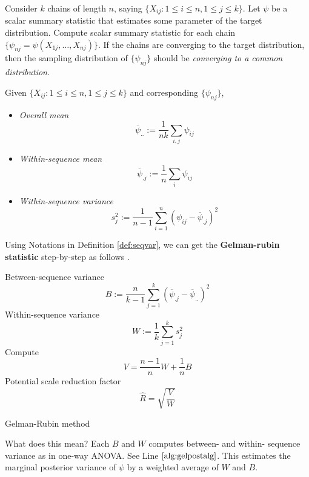 \documentclass[]{book}
\theoremstyle{definition}
\theoremstyle{definition}
\theoremstyle{definition}
\theoremstyle{remark}
\let\BeginKnitrBlock\begin \let\EndKnitrBlock\end
\begin{document}
Consider \(k\) chains of length \(n\), saying \(\{ X_{ij} : 1 \le i \le n, 1 \le j \le k \}\). Let \(\psi\) be a scalar summary statistic that estimates some parameter of the target distribution. Compute scalar summary statistic for each chain \(\{ \psi_{nj} = \psi(X_{1j}, \ldots, X_{nj}) \}\). If the chains are converging to the target distribution, then the sampling distribution of \(\{ \psi_{nj} \}\) should be \emph{converging to a common distribution}.

\BeginKnitrBlock{definition}[Sequence mean and variance]
\protect\hypertarget{def:seqvar}{}{\label{def:seqvar} {} }Given \(\{ X_{ij} : 1 \le i \le n, 1 \le j \le k \}\) and corresponding \(\{ \psi_{nj} \}\),

\begin{itemize}
  \item \textit{Overall mean} $$\overline{\psi}_{..} := \frac{1}{nk} \sum_{i,j} \psi_{ij}$$
  \item \textit{Within-sequence mean} $$\overline{\psi}_{.j} := \frac{1}{n} \sum_i \psi_{ij}$$
  \item \textit{Within-sequence variance} $$s_j^2 := \frac{1}{n - 1} \sum_{i = 1}^n (\psi_{ij} - \overline{\psi}_{.j})^2$$
\end{itemize}
\EndKnitrBlock{definition}

Using Notations in Definition \ref{def:seqvar}, we can get the \textbf{Gelman-rubin statistic} step-by-step as follows \citep{gimdalw:2013aa}.

\begin{algorithm}[H] \label{alg:gelmanalg}
  \SetAlgoLined
  Between-sequence variance $$B := \frac{n}{k -1}\sum_{j = 1}^k (\overline{\psi}_{.j} - \overline{\psi}_{..})^2$$\;
  Within-sequence variance $$W := \frac{1}{k} \sum_{j = 1}^k s_j^2$$\;
  Compute $$V = \frac{n - 1}{n} W + \frac{1}{n} B$$\; \label{alg:gelpostalg}
  Potential scale reduction factor $$\hat{R} = \sqrt{\frac{V}{W}}$$\; \label{alg:gelpotalg}
  \caption{Gelman-Rubin method}
\end{algorithm}

What does this mean? Each \(B\) and \(W\) computes between- and within- sequence variance as in one-way ANOVA. See Line \(\ref{alg:gelpostalg}\). This estimates the marginal posterior variance of \(\psi\) by a weighted average of \(W\) and \(B\).
\end{document}
